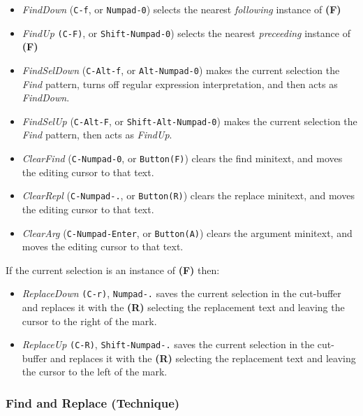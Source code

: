 \documentclass[
]{article}
\begin{document}
\begin{itemize}
\item
  \emph{FindDown} (\texttt{C-f}, or \texttt{Numpad-0}) selects the
  nearest \emph{following} instance of \textbf{(F)}
\item
  \emph{FindUp} \texttt{(C-F)}, or \texttt{Shift-Numpad-0}) selects the
  nearest \emph{preceeding} instance of \textbf{(F)}
\item
  \emph{FindSelDown} (\texttt{C-Alt-f}, or \texttt{Alt-Numpad-0}) makes
  the current selection the \emph{Find} pattern, turns off regular
  expression interpretation, and then acts as \emph{FindDown}.
\item
  \emph{FindSelUp} (\texttt{C-Alt-F}, or \texttt{Shift-Alt-Numpad-0})
  makes the current selection the \emph{Find} pattern, then acts as
  \emph{FindUp}.
\item
  \emph{ClearFind} (\texttt{C-Numpad-0}, or \texttt{Button(F)}) clears
  the find minitext, and moves the editing cursor to that text.
\item
  \emph{ClearRepl} (\texttt{C-Numpad-.}, or \texttt{Button(R)}) clears
  the replace minitext, and moves the editing cursor to that text.
\item
  \emph{ClearArg} (\texttt{C-Numpad-Enter}, or \texttt{Button(A)})
  clears the argument minitext, and moves the editing cursor to that
  text.
\end{itemize}

If the current selection is an instance of \textbf{(F)} then:

\begin{itemize}
\item
  \emph{ReplaceDown} \texttt{(C-r)}, \texttt{Numpad-.} saves the current
  selection in the cut-buffer and replaces it with the \textbf{(R)}
  selecting the replacement text and leaving the cursor to the right of
  the mark.
\item
  \emph{ReplaceUp} \texttt{(C-R)}, \texttt{Shift-Numpad-.} saves the
  current selection in the cut-buffer and replaces it with the
  \textbf{(R)} selecting the replacement text and leaving the cursor to
  the left of the mark.
\end{itemize}

\hypertarget{find-and-replace-technique}{%
\subsubsection{Find and Replace
(Technique)}\label{find-and-replace-technique}}
\end{document}
